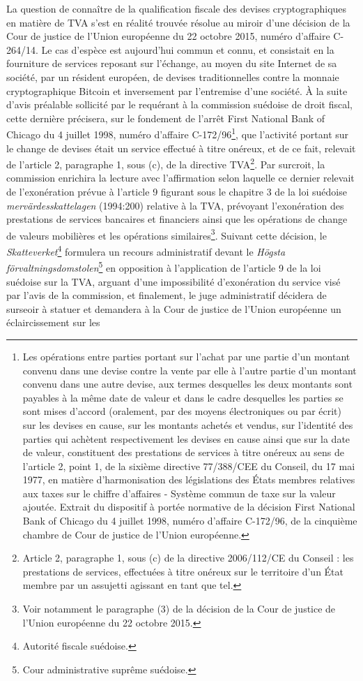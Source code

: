 {La question de connaître de la qualification fiscale des devises cryptographiques en matière de TVA s'est en réalité trouvée résolue au miroir d'une décision de la Cour de justice de l'Union européenne du 22 octobre 2015, numéro d'affaire C-264/14. Le cas d'espèce est aujourd'hui commun et connu, et consistait en la fourniture de services reposant sur l'échange, au moyen du site Internet de sa société, par un résident européen, de devises traditionnelles contre la monnaie cryptographique Bitcoin et inversement par l'entremise d'une société. À la suite d'avis préalable sollicité par le requérant à la commission suédoise de droit fiscal, cette dernière précisera, sur le fondement de l'arrêt First National Bank of Chicago du 4 juillet 1998, numéro d'affaire C-172/96\footnote{\og Les opérations entre parties portant sur l'achat par une partie d'un montant convenu dans une devise contre la vente par elle à l'autre partie d'un montant convenu dans une autre devise, aux termes desquelles les deux montants sont payables à la même date de valeur et dans le cadre desquelles les parties se sont mises d'accord (oralement, par des moyens électroniques ou par écrit) sur les devises en cause, sur les montants achetés et vendus, sur l'identité des parties qui achètent respectivement les devises en cause ainsi que sur la date de valeur, constituent des prestations de services à titre onéreux au sens de l'article 2, point 1, de la sixième directive 77/388/CEE du Conseil, du 17 mai 1977, en matière d'harmonisation des législations des États membres relatives aux taxes sur le chiffre d'affaires - Système commun de taxe sur la valeur ajoutée\fg{}. Extrait du dispositif à portée normative de la décision First National Bank of Chicago du 4 juillet 1998, numéro d'affaire C-172/96, de la cinquième chambre de Cour de justice de l'Union européenne.}, que l'activité portant sur le change de devises était un service effectué à titre onéreux, et de ce fait, relevait de l'article 2, paragraphe 1, sous (c), de la directive TVA\footnote{Article 2, paragraphe 1, sous (c) de la directive 2006/112/CE du Conseil : \og les prestations de services, effectuées à titre onéreux sur le territoire d'un État membre par un assujetti agissant en tant que tel\fg{}.}. Par surcroit, la commission enrichira la lecture avec l'affirmation selon laquelle ce dernier relevait de l'exonération prévue à l'article 9 figurant sous le chapitre 3 de la loi suédoise \emph{mervärdesskattelagen} (1994:200) relative à la TVA, prévoyant \og l'exonération des prestations de services bancaires et financiers ainsi que les opérations de change de valeurs mobilières et les opérations similaires\fg{}\footnote{Voir notamment le paragraphe (3) de la décision de la Cour de justice de l'Union européenne du 22 octobre 2015.}. Suivant cette décision, le \emph{Skatteverket}\footnote{Autorité fiscale suédoise.} formulera un recours administratif devant le \emph{Högsta förvaltningsdomstolen}\footnote{Cour administrative suprême suédoise.} en opposition à l'application de l'article 9 de la loi suédoise sur la TVA, arguant d'une impossibilité d'exonération du service visé par l'avis de la commission, et finalement, le juge administratif décidera de surseoir à statuer et demandera à la Cour de justice de l'Union européenne un éclaircissement sur les }
